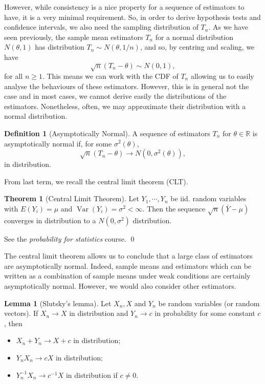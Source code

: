 \documentclass[
]{article}
\theoremstyle{definition}
\newtheorem{theorem}{Theorem}
\theoremstyle{definition}
\newtheorem{definition}{Definition}[section]
\newtheorem{lemma}{Lemma}[section]
\begin{document}
However, while consistency is a nice property for a sequence of
estimators to have, it is a very minimal requirement. So, in order to
derive hypothesis tests and confidence intervals, we also need the
sampling distribution of \(T_n\). As we have seen previously, the sample
mean estimators \(T_n\) for a normal distribution \(N(\theta, 1)\) has
distribution \(T_n \sim N(\theta, 1 / n)\), and so, by centring and
scaling, we have \[\sqrt{n}(T_n - \theta) \sim N(0, 1),\] for all
\(n \ge 1\). This means we can work with the CDF of \(T_n\) allowing us
to easily analyse the behaviours of these estimators. However, this is
in general not the case and in most cases, we cannot derive easily the
distributions of the estimators. Nonetheless, often, we may approximate
their distribution with a normal distribution.

\begin{definition}[Asymptotically Normal]
  A sequence of estimators \(T_n\) for \(\theta \in \mathbb{R}\) is asymptotically 
  normal if, for some \(\sigma^2(\theta)\), 
  \[\sqrt{n}(T_n - \theta) \to N(0, \sigma^2(\theta)),\]
  in distribution.
\end{definition}

From last term, we recall the central limit theorem (CLT).

\begin{theorem}[Central Limit Theorem]
  Let \(Y_1, \cdots, Y_n\) be iid. random variables with \(E(Y_i) = \mu\) and 
  \(\mathop{\mathrm{Var}}(Y_i) = \sigma^2 < \infty\). Then the sequence \(\sqrt{n}(\bar{Y} - \mu)\) 
  converges in distribution to a \(N(0, \sigma^2)\) distribution.
\end{theorem}
\proof

See the \emph{probability for statistics} course. \qed

The central limit theorem allows us to conclude that a large class of
estimators are asymptotically normal. Indeed, sample means and
estimators which can be written as a combination of sample means under
weak conditions are certainly asymptotically normal. However, we would
also consider other estimators.

\begin{lemma}[Slutsky's lemma]
  Let \(X_n, X\) and \(Y_n\) be random variables (or random vectors). If \(X_n \to X\) 
  in distribution and \(Y_n \to c\) in probability for some constant \(c\), then 
  \begin{itemize}
    \item \(X_n + Y_n \to X + c\) in distribution;
    \item \(Y_n X_n \to cX\) in distribution;
    \item \(Y^{-1}_n X_n \to c^{-1} X\) in distribution if \(c \neq 0\).
  \end{itemize}
\end{lemma}
\proof
\end{document}
